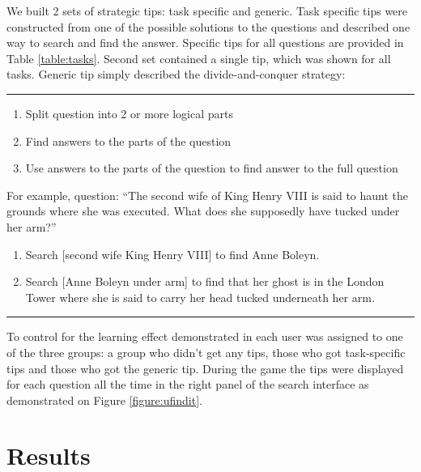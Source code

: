 \documentclass{sig-alternate}
\begin{document}
We built 2 sets of strategic tips: task specific and generic.
Task specific tips were constructed from one of the possible solutions to the questions and described one way to search and find the answer.
Specific tips for all questions are provided in Table \ref{table:tasks}.
Second set contained a single tip, which was shown for all tasks. Generic tip simply described the divide-and-conquer strategy:\\
\vspace{-2mm}
\hrule
\vspace{-2mm}
\begin{enumerate} \itemsep0pt \parskip0pt 
\item Split question into 2 or more logical parts
\item Find answers to the parts of the question
\item Use answers to the parts of the question to find answer to the full question
\end{enumerate}
\vspace{-2mm}
For example, question: ``The second wife of King Henry VIII is said to haunt the grounds where she was executed. What does she supposedly have tucked under her arm?''
\begin{enumerate} \itemsep0pt \parskip0pt 
\item Search [second wife King Henry VIII] to find Anne Boleyn.
\item Search [Anne Boleyn under arm] to find that her ghost is in the London Tower where she is said to carry her head tucked underneath her arm.
\end{enumerate}
\vspace{-1mm}
\hrule
\vspace{+2mm}
To control for the learning effect demonstrated in \cite{Moraveji:2011:MIU:2009916.2009966} each user was assigned to one of the three groups: a group who didn't get any tips, those who got task-specific tips and those who got the generic tip.
During the game the tips were displayed for each question all the time in the right panel of the search interface as demonstrated on Figure \ref{figure:ufindit}.

\section{Results}

\vspace{-1mm}
\end{document}
